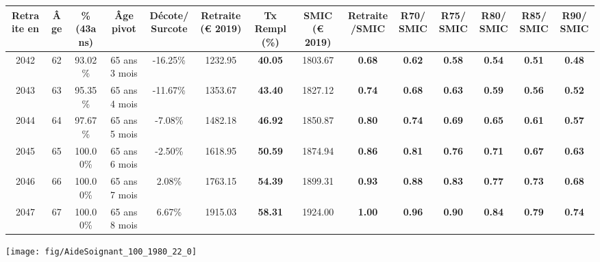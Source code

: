 \begin{adjustbox}{max width=\textwidth} 
\begin{tabular}[htb]{|c|c||c|c|c||c|c||c|c||c|c|c|c|c|} 
\hline 
 Retraite en &  Âge &  \%(43ans) &  Âge pivot &  Décote/Surcote &  Retraite (\euro{} 2019) &  Tx Rempl(\%) &  SMIC (\euro{} 2019) &  Retraite/SMIC &  R70/SMIC &  R75/SMIC &  R80/SMIC &  R85/SMIC &  R90/SMIC \\ 
\hline \hline 
 2042 &  62 &  93.02\% &  65 ans 3 mois &  -16.25\% &  1232.95 &  {\bf 40.05} &  1803.67 &  {\bf {\color{red} 0.68}} &  {\bf {\color{red} 0.62}} &  {\bf {\color{red} 0.58}} &  {\bf {\color{red} 0.54}} &  {\bf {\color{red} 0.51}} &  {\bf {\color{red} 0.48}} \\ 
\hline 
 2043 &  63 &  95.35\% &  65 ans 4 mois &  -11.67\% &  1353.67 &  {\bf 43.40} &  1827.12 &  {\bf {\color{red} 0.74}} &  {\bf {\color{red} 0.68}} &  {\bf {\color{red} 0.63}} &  {\bf {\color{red} 0.59}} &  {\bf {\color{red} 0.56}} &  {\bf {\color{red} 0.52}} \\ 
\hline 
 2044 &  64 &  97.67\% &  65 ans 5 mois &  -7.08\% &  1482.18 &  {\bf 46.92} &  1850.87 &  {\bf {\color{red} 0.80}} &  {\bf {\color{red} 0.74}} &  {\bf {\color{red} 0.69}} &  {\bf {\color{red} 0.65}} &  {\bf {\color{red} 0.61}} &  {\bf {\color{red} 0.57}} \\ 
\hline 
 2045 &  65 &  100.00\% &  65 ans 6 mois &  -2.50\% &  1618.95 &  {\bf 50.59} &  1874.94 &  {\bf {\color{red} 0.86}} &  {\bf {\color{red} 0.81}} &  {\bf {\color{red} 0.76}} &  {\bf {\color{red} 0.71}} &  {\bf {\color{red} 0.67}} &  {\bf {\color{red} 0.63}} \\ 
\hline 
 2046 &  66 &  100.00\% &  65 ans 7 mois &  2.08\% &  1763.15 &  {\bf 54.39} &  1899.31 &  {\bf {\color{red} 0.93}} &  {\bf {\color{red} 0.88}} &  {\bf {\color{red} 0.83}} &  {\bf {\color{red} 0.77}} &  {\bf {\color{red} 0.73}} &  {\bf {\color{red} 0.68}} \\ 
\hline 
 2047 &  67 &  100.00\% &  65 ans 8 mois &  6.67\% &  1915.03 &  {\bf 58.31} &  1924.00 &  {\bf {\color{red} 1.00}} &  {\bf {\color{red} 0.96}} &  {\bf {\color{red} 0.90}} &  {\bf {\color{red} 0.84}} &  {\bf {\color{red} 0.79}} &  {\bf {\color{red} 0.74}} \\ 
\hline 
\hline 
\end{tabular} 
\end{adjustbox} 
 
 \vspace{0.1cm} 

 {\hspace{-2.2cm}\texttt{[image: fig/AideSoignant\_100\_1980\_22\_0]}} 

